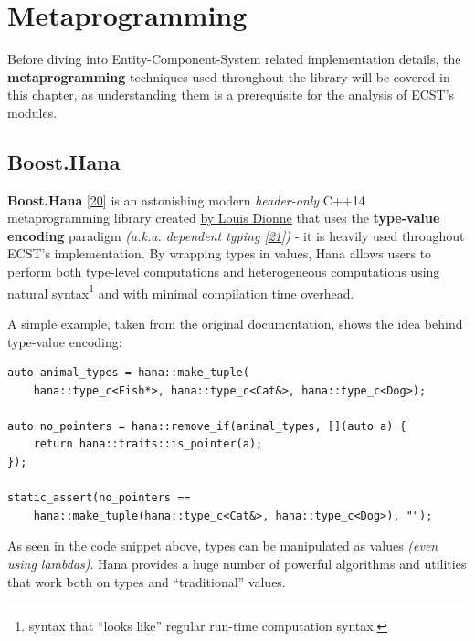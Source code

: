 \documentclass[twoside, 12pt, a4paper, openany]{book}
\begin{document}
\hypertarget{chap_ecst_metaprogramming}{\chapter{Metaprogramming}\label{chap_ecst_metaprogramming}}

Before diving into Entity-Component-System related implementation
details, the \textbf{metaprogramming} techniques used throughout the
library will be covered in this chapter, as understanding them is a
prerequisite for the analysis of ECST's modules.

\section{Boost.Hana}\label{boost.hana}

\textbf{Boost.Hana} {[}\protect\hyperlink{ref-boosthana}{20}{]} is an
astonishing modern \emph{header-only} C++14 metaprogramming library
created \href{http://ldionne.com/}{by Louis Dionne} that uses the
\textbf{type-value encoding} paradigm \emph{(a.k.a. dependent typing
{[}\protect\hyperlink{ref-pfultz2_dependentyping}{21}{]})} - it is
heavily used throughout ECST's implementation. By wrapping types in
values, Hana allows users to perform both type-level computations and
heterogeneous computations using natural syntax\footnote{syntax that
  ``looks like'' regular run-time computation syntax.} and with minimal
compilation time overhead.

A simple example, taken from the original documentation, shows the idea
behind type-value encoding:

\begin{verbatim}
auto animal_types = hana::make_tuple(
    hana::type_c<Fish*>, hana::type_c<Cat&>, hana::type_c<Dog>);

auto no_pointers = hana::remove_if(animal_types, [](auto a) {
    return hana::traits::is_pointer(a);
});

static_assert(no_pointers ==
    hana::make_tuple(hana::type_c<Cat&>, hana::type_c<Dog>), "");
\end{verbatim}

As seen in the code snippet above, types can be manipulated as values
\emph{(even using lambdas)}. Hana provides a huge number of powerful
algorithms and utilities that work both on types and ``traditional''
values.
\end{document}
